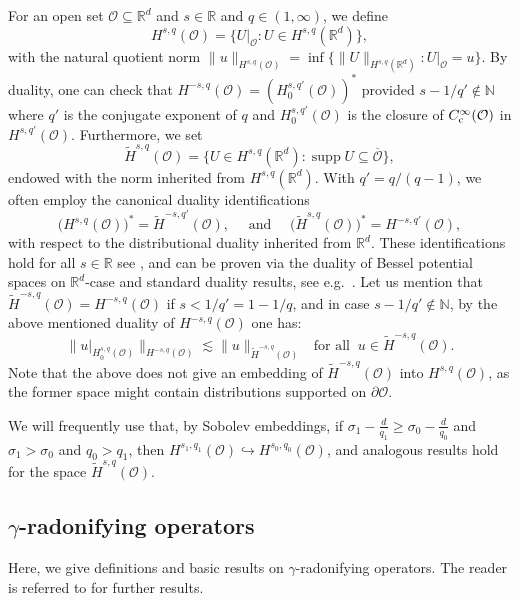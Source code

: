 \documentclass[reqno]{amsart}
\theoremstyle{plain}
\theoremstyle{remark}
\theoremstyle{plain}
\numberwithin{equation}{section}
\newcommand\cO{\mathcal{O}}
\def\N{{\mathbb N}}
\def\R{{\mathbb R}}
\newcommand{\wt}{\widetilde}
\newcommand{\1}{\one}
\begin{document}
For an open set $\mathcal{O}\subseteq \R^d$ and 
\(s\in\mathbb R\) and \(q\in(1,\infty)\), we define
\[
H^{s,q}(\mathcal O)
=
\{U|_{\mathcal O}: U\in H^{s,q}(\mathbb R^d)\},
\]
with the natural quotient norm
$
\|u\|_{H^{s,q}(\mathcal O)}
=
\inf\{\|U\|_{H^{s,q}(\mathbb R^d)}: U|_{\mathcal O}=u\}.
$
By duality, one can check that $H^{-s,q}(\cO)=(H^{s,q'}_0(\cO))^*$ provided $s-1/q'\not\in \N$ where $q'$ is the conjugate exponent of $q$ and $H^{s,q'}_0(\cO)$ is the closure of $C^\infty_{{\rm c}}(\cO)$ in $H^{s,q'}(\cO)$.
Furthermore, we set
\[
\widetilde H^{s,q}(\mathcal O)
=
\big\{U\in H^{s,q}(\mathbb R^d): \operatorname{supp} U\subseteq \overline{\mathcal O}\big\},
\]
endowed with the norm inherited from \(H^{s,q}(\mathbb R^d)\).
With \(q'=q/(q-1)\), we often employ the canonical duality identifications
\begin{equation}\label{eq:dualHtilde}
\big(H^{s,q}(\mathcal O)\big)^*=\widetilde H^{-s,q'}(\mathcal O),
\quad \text{ and }\quad 
\big(\widetilde H^{s,q}(\mathcal O)\big)^*
=
H^{-s,q'}(\mathcal O),
\end{equation}
with respect to the distributional duality inherited from \(\mathbb R^d\). 
These identifications hold for all \(s\in\mathbb R\) see \cite[Theorem 4.8.1]{Tri95}, and can be proven via the duality of Bessel potential spaces on $\R^d$-case and standard duality results, see e.g.\ \cite[Proposition B.1.4]{HNVW1}. Let us mention that $\wt{H}^{-s,q}(\cO)=H^{-s,q}(\cO)$ if $s<1/q'=1-1/q$, and in case $s-1/q'\not\in \N$, by the above mentioned duality of $H^{-s,q}(\cO)$ one has:
\begin{equation}
\label{eq:restriction_properties_of_tilde_spaces}
\big\|u|_{H^{s,q}_0(\cO)}\big\|_{H^{-s,q}(\cO)}
\lesssim \|u\|_{\wt{H}^{-s,q}(\cO)} \ \ \text{ for all } \ u\in \wt{H}^{-s,q}(\cO).
\end{equation}
Note that the above does not give an embedding of $\wt{H}^{-s,q}(\cO)$ into $H^{s,q}(\cO)$, as the former space might contain distributions supported on $\partial\cO$. 



We will frequently use that, by Sobolev embeddings, if $\sigma_1-\frac{d}{q_1}\geq \sigma_0-\frac{d}{q_0}$ and $\sigma_1>\sigma_0$ and $q_0>q_1$, then $H^{s_1, q_1}(\mathcal{O})\hookrightarrow H^{s_0, q_0}(\mathcal{O})$, 
and analogous results hold for the space $\wt{H}^{s,q}(\cO)$.



\subsection{$\gamma$-radonifying operators}
\label{sss:gamma_spaces}
Here, we give definitions and basic results on $\gamma$-radonifying operators.
The reader is referred to \cite[Chapter 9]{HNVW2} for further results.
\end{document}

